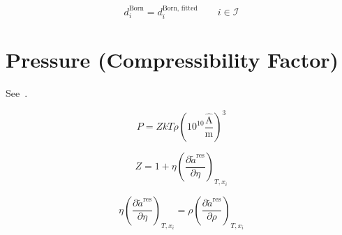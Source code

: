 \documentclass[12pt, letterpaper]{article}
\begin{document}

\begin{equation}
    d^{\text{Born}}_{i} = d^{\text{Born, fitted}}_{i} \qquad i\in\mathcal{I}
    \label{eq:d_born_fitted}
\end{equation}

\section{Pressure (Compressibility Factor)}

See~\cite{Gross2001}.

\begin{equation}
    P=ZkT\rho\left(10^{10}\frac{\hat{\mathrm{A}}}{\mathrm{m}}\right)^{3}
    \label{eq:pressure_from_z}
\end{equation}


\begin{equation}
    Z=1+\eta\left(\frac{\partial\tilde{a}^\mathrm{res}}{\partial\eta}\right)_{T,x_{i}}
    \label{eq:z_from_eta}
\end{equation}

\begin{equation}
    \eta\left(\frac{\partial\tilde{a}^\mathrm{res}}{\partial\eta}\right)_{T,x_{i}} = \rho\left(\frac{\partial\tilde{a}^\mathrm{res}}{\partial\rho}\right)_{T,x_{i}}
    \label{eq:z_eta_rho_identity}
\end{equation}
\end{document}
